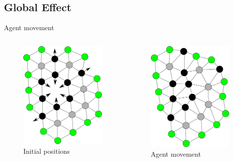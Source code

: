 \documentclass{beamer}
\begin{document}
\subsection{Global Effect}
\begin{frame}{Agent movement}
  \begin{columns}
      \begin{figure}
        \begin{center}
          \includegraphics[width=5cm]{PerimeterBotsCircle3.pdf}
        \end{center}
        \caption{Initial positions}
      \end{figure}
        \begin{figure}
          \begin{center}
            \includegraphics[width=5cm]{PerimeterBotsCircle4.pdf}
          \end{center}
          \caption{Agent movement}
        \end{figure}
    \end{columns}
\end{frame}  
\end{document}

